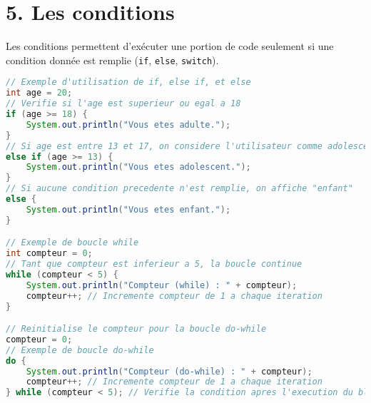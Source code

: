 \documentclass{article}
\begin{document}
\section*{5. Les conditions}
Les conditions permettent d'exécuter une portion de code seulement si une condition donnée est remplie (\texttt{if}, \texttt{else}, \texttt{switch}).
\begin{lstlisting}[language=Java]
// Exemple d'utilisation de if, else if, et else
int age = 20;
// Verifie si l'age est superieur ou egal a 18
if (age >= 18) {
    System.out.println("Vous etes adulte.");
}
// Si age est entre 13 et 17, on considere l'utilisateur comme adolescent
else if (age >= 13) {
    System.out.println("Vous etes adolescent.");
}
// Si aucune condition precedente n'est remplie, on affiche "enfant"
else {
    System.out.println("Vous etes enfant.");
}

// Exemple de boucle while
int compteur = 0;
// Tant que compteur est inferieur a 5, la boucle continue
while (compteur < 5) {
    System.out.println("Compteur (while) : " + compteur);
    compteur++; // Incremente compteur de 1 a chaque iteration
}

// Reinitialise le compteur pour la boucle do-while
compteur = 0;
// Exemple de boucle do-while
do {
    System.out.println("Compteur (do-while) : " + compteur);
    compteur++; // Incremente compteur de 1 a chaque iteration
} while (compteur < 5); // Verifie la condition apres l'execution du bloc
\end{lstlisting}
\end{document}

